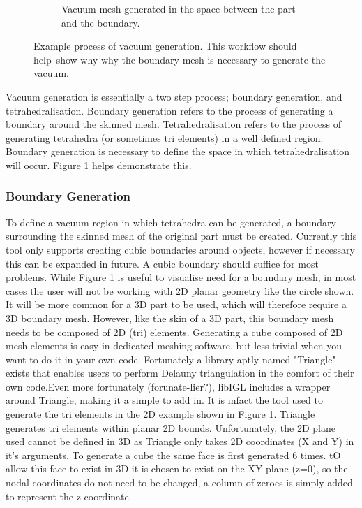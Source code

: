 \documentclass[12pt, letterpaper]{article}
\begin{document}
\begin{figure}
\begin{subfigure}{0.4\textwidth}
	    \caption{Vacuum mesh generated in the space between the part and the boundary.}
	\end{subfigure}
	\caption{Example process of vacuum generation. This workflow should help\
	show why why the boundary mesh is necessary to generate the vacuum.}
	\label{Boundary Example}
\end{figure}
Vacuum generation is essentially a two step process; boundary generation, and tetrahedralisation. Boundary generation refers to the process of generating a boundary around the skinned mesh. Tetrahedralisation refers to the process of generating tetrahedra (or sometimes tri elements) in a well defined region. Boundary generation is necessary to define the space in which tetrahedralisation will occur. Figure \ref{Boundary Example} helps demonstrate this.

\subsubsection{Boundary Generation} \label{BoundaryGeneration}
To define a vacuum region in which tetrahedra can be generated, a boundary surrounding the skinned mesh of the original part must be created. Currently this tool only supports creating cubic boundaries around objects, however if necessary this can be expanded in future. A cubic boundary should suffice for most problems. While Figure \ref{Boundary Example} is useful to visualise need for a boundary mesh, in most cases the user will not be working with 2D planar geometry like the circle shown. It will be more common for a 3D part to be used, which will therefore require a 3D boundary mesh. However, like the skin of a 3D part, this boundary mesh needs to be composed of 2D (tri) elements. Generating a cube composed of 2D mesh elements is easy in dedicated meshing software, but less trivial when you want to do it in your own code. Fortunately a library aptly named "Triangle" exists that enables users to perform Delauny triangulation in the comfort of their own code.Even more fortunately (forunate-lier?), libIGL includes a wrapper around Triangle, making it a simple to add in. It is infact the tool used to generate the tri elements in the 2D example shown in Figure \ref{Boundary Example}. Triangle generates tri elements within planar 2D bounds. Unfortunately, the 2D plane used cannot be defined in 3D as Triangle only takes 2D coordinates (X and Y) in it's arguments. To generate a cube the same face is first generated 6 times. tO allow this face to exist in 3D it is chosen to exist on the XY plane (z=0), so the nodal coordinates do not need to be changed, a column of zeroes is simply added to represent the z coordinate. 
\end{document}

